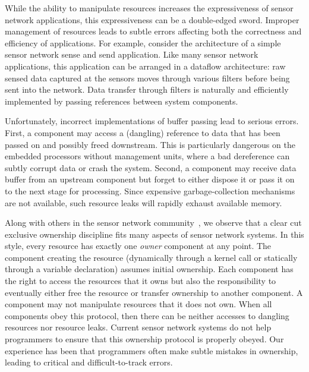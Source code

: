 While the ability to manipulate resources increases the expressiveness of
sensor network applications, this expressiveness can be a double-edged
sword.  
%
Improper management of resources leads to subtle errors affecting both the
correctness and efficiency of applications.
%
For example, consider the architecture of a simple sensor network sense and
send application.  
%
Like many sensor network applications, this application can be arranged in
a dataflow architecture:  raw sensed data captured at the sensors moves
through various filters before being sent into the network.  
%
Data transfer through filters is naturally and efficiently implemented by
passing references between system components.



Unfortunately, incorrect implementations of buffer passing lead to serious
errors.  
%
First, a component may access a (dangling) reference to data that has been
passed on and possibly freed downstream. 
%
This is particularly dangerous on the embedded processors without management
units, where a bad dereference can subtly corrupt data or crash the system. 
%
Second, a component may receive data buffer from an upstream component but
forget to either dispose it or pass it on to the next stage for processing.
%
Since expensive garbage-collection mechanisms are not available, such resource
leaks will rapidly exhaust available memory.



Along with others in the sensor network community~\cite{07interface,XXX}, we
observe that a clear cut exclusive ownership discipline fits many aspects of
sensor network systems.
%
In this style, every resource has exactly one {\em owner} component at any
point.  
%
The component creating the resource (dynamically through a kernel call or
statically through a variable declaration) assumes initial ownership.  
%
Each component has the right to access the resources that it owns but also the
responsibility to eventually either free the resource or transfer ownership to
another component.  
%
A component may not manipulate resources that it does not own.  
%
When all components obey this protocol, then there can be neither accesses to
dangling resources nor resource leaks.
%
Current sensor network systems do not help programmers to ensure that this
ownership protocol is properly obeyed.  
%
Our experience has been that programmers often make subtle mistakes in
ownership, leading to critical and difficult-to-track errors.  



